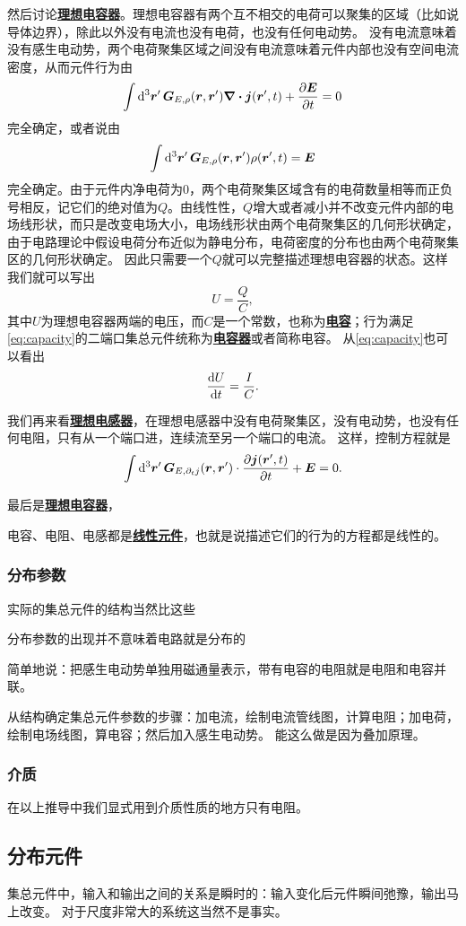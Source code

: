 \documentclass[UTF8, a4paper]{ctexart}
\newcommand*{\concept}[1]{\underline{\textbf{#1}}}
\begin{document}
然后讨论\concept{理想电容器}。理想电容器有两个互不相交的电荷可以聚集的区域（比如说导体边界），除此以外没有电流也没有电荷，也没有任何电动势。
没有电流意味着没有感生电动势，两个电荷聚集区域之间没有电流意味着元件内部也没有空间电流密度，从而元件行为由
\[
    \int \dd[3]{\vb*{r}'} \vb*{G}_{E, \rho}(\vb*{r}, \vb*{r}') \div{\vb*{j}}(\vb*{r}', t) + \pdv{\vb*{E}}{t} = 0
\]
完全确定，或者说由
\[
    \int \dd[3]{\vb*{r}'} \vb*{G}_{E, \rho}(\vb*{r}, \vb*{r}') \rho(\vb*{r}', t) = \vb*{E}
\]
完全确定。由于元件内净电荷为0，两个电荷聚集区域含有的电荷数量相等而正负号相反，记它们的绝对值为$Q$。由线性性，$Q$增大或者减小并不改变元件内部的电场线形状，而只是改变电场大小，电场线形状由两个电荷聚集区的几何形状确定，由于电路理论中假设电荷分布近似为静电分布，电荷密度的分布也由两个电荷聚集区的几何形状确定。
因此只需要一个$Q$就可以完整描述理想电容器的状态。这样我们就可以写出
\begin{equation}
    U = \frac{Q}{C},
    \label{eq:capacity}
\end{equation}
其中$U$为理想电容器两端的电压，而$C$是一个常数，也称为\concept{电容}；行为满足\eqref{eq:capacity}的二端口集总元件统称为\concept{电容器}或者简称电容。
从\eqref{eq:capacity}也可以看出
\[
    \dv{U}{t} = \frac{I}{C}.
\]

我们再来看\concept{理想电感器}，在理想电感器中没有电荷聚集区，没有电动势，也没有任何电阻，只有从一个端口进，连续流至另一个端口的电流。
这样，控制方程就是
\[
    \int \dd[3]{\vb*{r}'} \vb*{G}_{E, \partial_t j}(\vb*{r}, \vb*{r}') \cdot \pdv{\vb*{j}(\vb*{r}', t)}{t} + \vb*{E} = 0.
\]

最后是\concept{理想电容器}，

电容、电阻、电感都是\concept{线性元件}，也就是说描述它们的行为的方程都是线性的。

\subsubsection{分布参数}

实际的集总元件的结构当然比这些

分布参数的出现并不意味着电路就是分布的

简单地说：把感生电动势单独用磁通量表示，带有电容的电阻就是电阻和电容并联。

从结构确定集总元件参数的步骤：加电流，绘制电流管线图，计算电阻；加电荷，绘制电场线图，算电容；然后加入感生电动势。
能这么做是因为叠加原理。

\subsubsection{介质}

在以上推导中我们显式用到介质性质的地方只有电阻。

\subsection{分布元件}

集总元件中，输入和输出之间的关系是瞬时的：输入变化后元件瞬间弛豫，输出马上改变。
对于尺度非常大的系统这当然不是事实。
\end{document}
